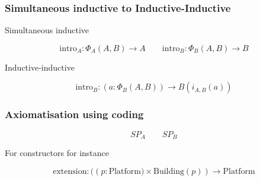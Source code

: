 \documentclass{beamer}
\begin{document}
\begin{frame}
	\frametitle{Simultaneous inductive to Inductive-Inductive}

	Simultaneous inductive

	$$ \text{intro}_A : \Phi_A(A, B) \rightarrow A \quad\quad \text{intro}_B : \Phi_B(A, B) \rightarrow B $$

	Inductive-inductive

	$$ \text{intro}_B : (a : \Phi_B(A, B)) \rightarrow B(i_{A,B} (a)) $$

\end{frame}

\begin{frame}
    \frametitle{Axiomatisation using coding}

	$$ SP_A \quad\quad SP_B $$

    For constructors for instance
     
	$$ \text{extension} : ((p : \text{Platform)} \times \text{Building}(p)) \rightarrow \text{Platform} $$

\end{frame}
\end{document}
